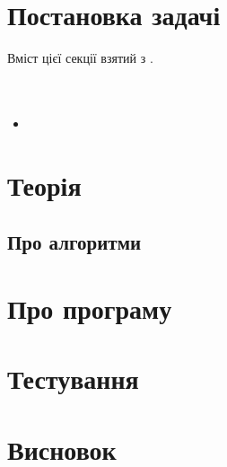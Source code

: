\nocite{*}
\sffamily

\section{Постановка задачі}
Вміст цієї секції взятий з \cite{CSHPiskunov}.\\
 \\
 \\
\begin{itemize}
	\item
\end{itemize}

\section{Теорія}
\subsection{Про алгоритми}

\section{Про програму}

\section{Тестування}

\section{Висновок}